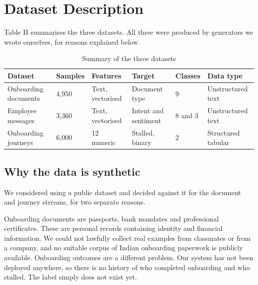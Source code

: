 \documentclass[conference]{IEEEtran}
\begin{document}
\section{Dataset Description}
Table II summarises the three datasets. All three were produced by generators we wrote ourselves, for reasons explained below.

\begin{table}[!t]
\centering
\caption{Summary of the three datasets}
\footnotesize
\setlength{\tabcolsep}{3pt}
\begin{tabular}{p{}p{}p{}p{}p{}p{}}
\toprule
\textbf{Dataset} & \textbf{Samples} & \textbf{Features} & \textbf{Target} & \textbf{Classes} & \textbf{Data type} \\
\midrule
Onboarding documents & 4,950 & Text, vectorised & Document type & 9 & Unstructured text \\
Employee messages & 3,360 & Text, vectorised & Intent and sentiment & 8 and 3 & Unstructured text \\
Onboarding journeys & 6,000 & 12 numeric & Stalled, binary & 2 & Structured tabular \\
\bottomrule
\end{tabular}
\end{table}

\subsection{Why the data is synthetic}
We considered using a public dataset and decided against it for the document and journey streams, for two separate reasons.

Onboarding documents are passports, bank mandates and professional certificates. These are personal records containing identity and financial information. We could not lawfully collect real examples from classmates or from a company, and no suitable corpus of Indian onboarding paperwork is publicly available. Onboarding outcomes are a different problem. Our system has not been deployed anywhere, so there is no history of who completed onboarding and who stalled. The label simply does not exist yet.
\end{document}
